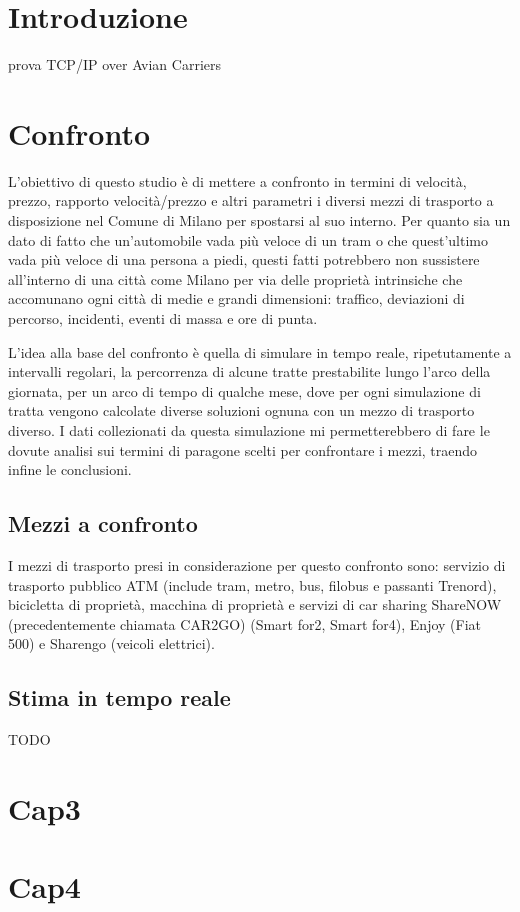 \documentclass[a4paper]{report}
\begin{document}
	\tableofcontents
	
	\chapter{Introduzione}
	{\large
		prova
	}
	TCP/IP over Avian Carriers\cite{waitzman1990standard}

	\chapter{Confronto}
	{\large
		L'obiettivo di questo studio è di mettere a confronto in termini di velocità, prezzo, rapporto velocità/prezzo e altri parametri i diversi mezzi di trasporto a disposizione nel Comune di Milano per spostarsi al suo interno. Per quanto sia un dato di fatto che un'automobile vada più veloce di un tram o che quest'ultimo vada più veloce di una persona a piedi, questi fatti potrebbero non sussistere all'interno di una città come Milano per via delle proprietà intrinsiche che accomunano ogni città di medie e grandi dimensioni: traffico, deviazioni di percorso, incidenti, eventi di massa e ore di punta.
	}

	{\large
		L'idea alla base del confronto è quella di simulare in tempo reale, ripetutamente a intervalli regolari, la percorrenza di alcune tratte prestabilite lungo l'arco della giornata, per un arco di tempo di qualche mese, dove per ogni simulazione di tratta vengono calcolate diverse soluzioni ognuna con un mezzo di trasporto diverso. I dati collezionati da questa simulazione mi permetterebbero di fare le dovute analisi sui termini di paragone scelti per confrontare i mezzi, traendo infine le conclusioni.
	}

		\section{Mezzi a confronto}
		{\large
			I mezzi di trasporto presi in considerazione per questo confronto sono: servizio di trasporto pubblico ATM (include tram, metro, bus, filobus e passanti Trenord), bicicletta di proprietà, macchina di proprietà e servizi di car sharing ShareNOW (precedentemente chiamata CAR2GO) (Smart for2, Smart for4), Enjoy (Fiat 500) e Sharengo (veicoli elettrici).
		}
	
		\section{Stima in tempo reale}
		{\large
			TODO
		}
	
	
	\chapter{Cap3}
	\chapter{Cap4}

	
	
\end{document}
